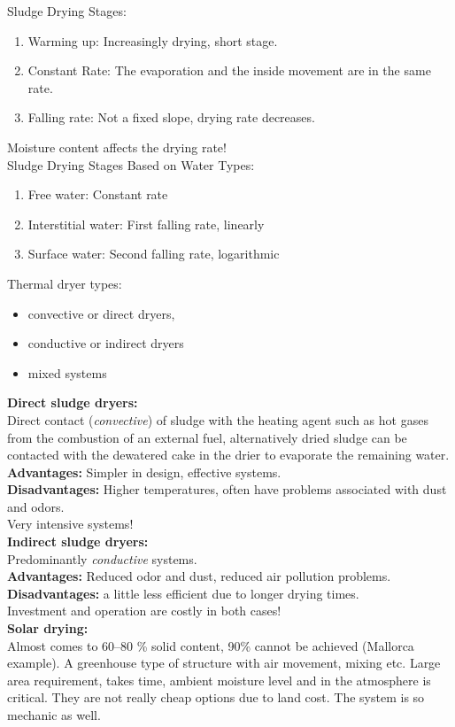 \documentclass{article}
\numberwithin{equation}{section}
\begin{document}
Sludge Drying Stages:
\begin{enumerate}
    \item Warming up: Increasingly drying, short stage.
    \item Constant Rate: The evaporation and the inside movement are in the same rate.
    \item Falling rate: Not a fixed slope, drying rate decreases.
\end{enumerate}
Moisture content affects the drying rate!\\
Sludge Drying Stages Based on Water Types:
\begin{enumerate}
    \item Free water: Constant rate
    \item Interstitial water: First falling rate, linearly
    \item Surface water: Second falling rate, logarithmic
\end{enumerate}
Thermal dryer types:
\begin{itemize}
    \item convective or direct dryers,
    \item conductive or indirect dryers
    \item mixed systems
\end{itemize}
\textbf{Direct sludge dryers:}\\
Direct contact (\textsl{convective}) of sludge with the heating agent such as hot gases from the combustion of an external fuel, alternatively dried sludge can be contacted with the dewatered cake in the drier to evaporate the remaining water.\\
\textbf{Advantages:} Simpler in design, effective systems.\\
\textbf{Disadvantages:} Higher temperatures, often have problems associated with dust and odors.\\
Very intensive systems!\\
\textbf{Indirect sludge dryers:}\\
Predominantly \textsl{conductive} systems.\\
\textbf{Advantages:} Reduced odor and dust, reduced air pollution problems.\\
\textbf{Disadvantages:} a little less efficient due to longer drying times.\\
Investment and operation are costly in both cases!\\
\textbf{Solar drying:}\\
Almost comes to 60--80 \% solid content, 90\% cannot be achieved (Mallorca example). A greenhouse type of structure with air movement, mixing etc. Large area requirement, takes time, ambient moisture level and in the atmosphere is critical. They are not really cheap options due to land cost. The system is so mechanic as well.
\end{document}
